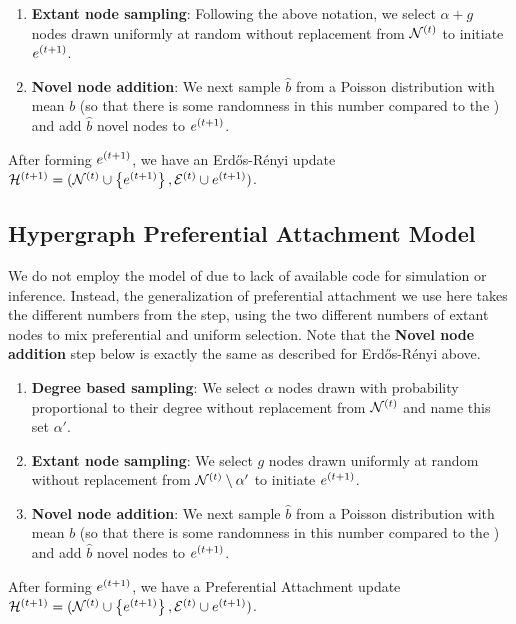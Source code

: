 \begin{enumerate}
    \item \textbf{Extant node sampling}: Following the above notation, we select $\alpha + g$ nodes drawn uniformly at random without replacement from $\mathcal{N}^{(t)}$ to initiate $e^{(t+1)}$.
    \item \textbf{Novel node addition}: We next sample $\hat{b}$ from a Poisson distribution with mean $b$ (so that there is some randomness in this number compared to the \model) and add $\hat{b}$ novel nodes to $e^{(t+1)}$.
\end{enumerate}
After forming $e^{(t+1)}$, we have an Erd\H{o}s-R\'enyi update $\mathcal{H}^{(t+1)} = (\mathcal{N}^{(t)} \cup \left\{e^{(t+1)}\right\}, \mathcal{E}^{(t)} \cup {e^{(t+1)}})$. 

\subsection{Hypergraph Preferential Attachment Model}

We do not employ the model of \cite{avinRandomPreferentialAttachment2019} due to lack of available code for simulation or inference. Instead, the generalization of preferential attachment we use here takes the different numbers from the \model step, using the two different numbers of extant nodes to mix preferential and uniform selection. Note that the \textbf{Novel node addition} step below is exactly the same as described for Erd\H{o}s-R\'enyi above.
\begin{enumerate}
    \item \textbf{Degree based sampling}: We select $\alpha$ nodes drawn with probability proportional to their degree without replacement from $\mathcal{N}^{(t)}$ and name this set $\alpha'$.
    \item \textbf{Extant node sampling}: We select $g$ nodes drawn uniformly at random without replacement from $\mathcal{N}^{(t)} \setminus \alpha'$ to initiate $e^{(t+1)}$.
    \item \textbf{Novel node addition}: We next sample $\hat{b}$ from a Poisson distribution with mean $b$ (so that there is some randomness in this number compared to the \model) and add $\hat{b}$ novel nodes to $e^{(t+1)}$. 
\end{enumerate}
After forming $e^{(t+1)}$, we have a Preferential Attachment update $\mathcal{H}^{(t+1)} = (\mathcal{N}^{(t)} \cup \left\{e^{(t+1)}\right\}, \mathcal{E}^{(t)} \cup {e^{(t+1)}})$. 




